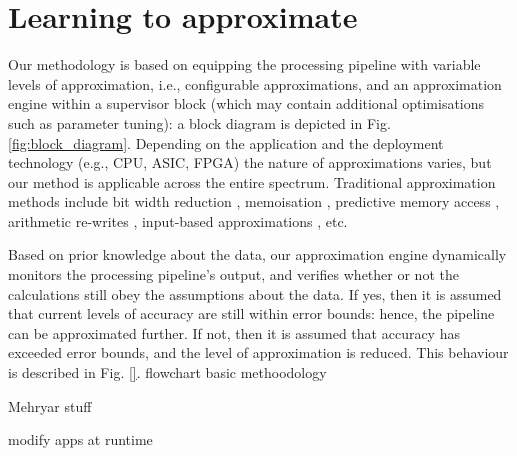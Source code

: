 \section{Learning to approximate}\label{learning}

Our methodology is based on equipping the processing pipeline with variable levels of approximation, i.e., configurable approximations, and an approximation engine within a supervisor block (which may contain additional optimisations such as parameter tuning): a block diagram is depicted in Fig. \ref{fig:block_diagram}. Depending on the application and the deployment technology (e.g., CPU, ASIC, FPGA) the nature of approximations varies, but our method is applicable across the entire spectrum. Traditional approximation methods include bit width reduction \cite{mittal2016survey}, memoisation \cite{sinha2016low}, predictive memory access \cite{yazdanbakhsh2016mitigating}, arithmetic re-writes \cite{nepal2016automated}, input-based approximations \cite{raha2016input}, etc.
\par Based on prior knowledge about the data, our approximation engine dynamically monitors the processing pipeline's output, and verifies whether or not the calculations still obey the assumptions about the data. If yes, then it is assumed that current levels of accuracy are still within error bounds: hence, the pipeline can be approximated further. If not, then it is assumed that accuracy has exceeded error bounds, and the level of approximation is reduced. This behaviour is described in Fig. \ref{}. 
	flowchart basic methoodology
	\par Mehryar stuff
	\par modify apps at runtime
